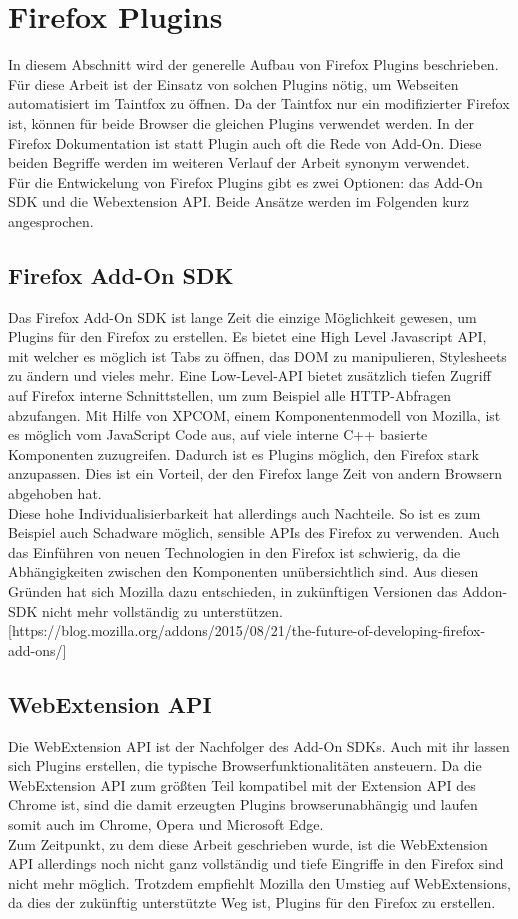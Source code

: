\section{Firefox Plugins}
In diesem Abschnitt wird der generelle Aufbau von Firefox Plugins beschrieben. Für diese Arbeit ist der Einsatz von solchen Plugins nötig, um Webseiten automatisiert im Taintfox zu öffnen. Da der Taintfox nur ein modifizierter Firefox ist, können für beide Browser die gleichen Plugins verwendet werden. In der Firefox Dokumentation ist statt Plugin auch oft die Rede von Add-On. Diese beiden Begriffe werden im weiteren Verlauf der Arbeit synonym verwendet. \\
Für die Entwickelung von Firefox Plugins gibt es zwei Optionen: das Add-On SDK und die Webextension API. Beide Ansätze werden im Folgenden kurz angesprochen.
\subsection{Firefox Add-On SDK}
Das Firefox Add-On SDK ist lange Zeit die einzige Möglichkeit gewesen, um Plugins für den Firefox zu erstellen. Es bietet eine High Level Javascript API, mit welcher es möglich ist Tabs zu öffnen, das DOM zu manipulieren, Stylesheets zu ändern und vieles mehr. Eine Low-Level-API bietet zusätzlich tiefen Zugriff auf Firefox interne Schnittstellen, um zum Beispiel alle HTTP-Abfragen abzufangen. Mit Hilfe von XPCOM, einem Komponentenmodell von Mozilla, ist es möglich vom JavaScript Code aus, auf viele interne C++ basierte Komponenten zuzugreifen. Dadurch ist es Plugins möglich, den Firefox stark anzupassen. Dies ist ein Vorteil, der den Firefox lange Zeit von andern Browsern abgehoben hat. \\
Diese hohe Individualisierbarkeit hat allerdings auch Nachteile. So ist es zum Beispiel auch Schadware möglich, sensible APIs des Firefox zu verwenden. Auch das Einführen von neuen Technologien in den Firefox ist schwierig, da die Abhängigkeiten zwischen den Komponenten unübersichtlich sind. Aus diesen Gründen hat sich Mozilla dazu entschieden, in zukünftigen Versionen das Addon-SDK nicht mehr vollständig zu unterstützen. [https://blog.mozilla.org/addons/2015/08/21/the-future-of-developing-firefox-add-ons/]
\subsection{WebExtension API}
Die WebExtension API ist der Nachfolger des Add-On SDKs. Auch mit ihr lassen sich Plugins erstellen, die typische Browserfunktionalitäten ansteuern. Da die WebExtension API zum größten Teil kompatibel mit der Extension API des Chrome ist, sind die damit erzeugten Plugins browserunabhängig und laufen somit auch im Chrome, Opera und Microsoft Edge. \\
Zum Zeitpunkt, zu dem diese Arbeit geschrieben wurde, ist die WebExtension API allerdings noch nicht ganz vollständig und tiefe Eingriffe in den Firefox sind nicht mehr möglich. Trotzdem empfiehlt Mozilla den Umstieg auf WebExtensions, da dies der zukünftig unterstützte Weg ist, Plugins für den Firefox zu erstellen.
